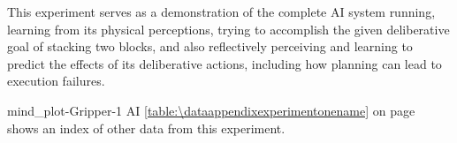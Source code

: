  {This experiment serves as a demonstration of the
  complete AI system running, learning from its physical perceptions,
  trying to accomplish the given deliberative goal of stacking two
  blocks, and also reflectively perceiving and learning to predict the
  effects of its deliberative actions, including how planning can lead
  to execution failures.}




{\clearpage
  \experimentcausegroupplots{\dataappendixmaxtime}
                            {\dataappendixexperimentonemaxtime}
                            {\dataappendixexperimenttwomaxtime}
                            {\dataappendixexperimentthreemaxtime}
                            {\dataappendixexperimentonename}
                            {\dataappendixexperimenttwoname}
                            {\dataappendixexperimentthreename}
                            {\dataappendixexperimentoneprettyname}
                            {\dataappendixexperimenttwoprettyname}
                            \experimentcausegroupplotscontinued{\dataappendixexperimentthreeprettyname}
                                                               {mind_plot-Gripper-1}
                                                               {AI}
                                                               { {\mbox{\autoref{table:\dataappendixexperimentonename}}} on
                                                                 {\mbox{page~\pageref{table:\dataappendixexperimentonename}}} shows an index of other data
                                                                 from this experiment.}
}                                                            
